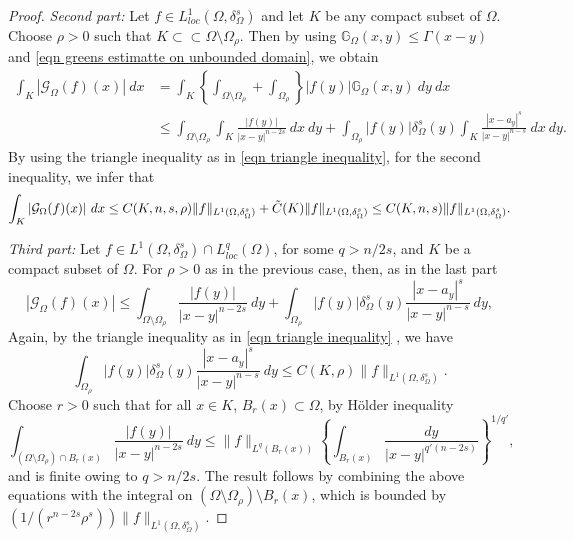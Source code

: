 \documentclass[10pt,a4paper]{amsart}
\newcommand{\g}[1]{\mathcal{G}_{#1}}
\newcommand{\gk}[1]{\mathbb{G}_{#1}}
\begin{document}
\begin{proof}
    \textit{Second part:}
    Let $f\in L^{1}_{loc}(\Omega,\delta_{\Omega}^{s})$ and let $K$ be any compact subset of $\Omega$. Choose $\rho>0$ such that $K\subset\subset \Omega\setminus\Omega_{\rho}$. Then by using $\gk{\Omega}(x,y)\leq \Gamma(x-y)$ and \eqref{eqn greens estimatte on unbounded domain}, we obtain
    \begin{equation*}
        \begin{split}
            \int_{K}|\g{\Omega}(f)(x)|\ dx&=\int_{K}\left\{\int_{\Omega\setminus\Omega_{\rho}}+\int_{\Omega_{\rho}}\right\}|f(y)|\gk{\Omega}(x,y)\ dy\ dx\\
            &\leq \int_{\Omega\setminus\Omega_{\rho}}\int_{K}\frac{|f(y)|}{|x-y|^{n-2s}}\ dx\ dy+\int_{\Omega_{\rho}}|f(y)|\delta_{\Omega}^{s}(y)\int_{K}\frac{|x-a_y|^{s}}{|x-y|^{n-s}}\ dx \ dy.
        \end{split}
    \end{equation*}
    By using the triangle inequality as in \eqref{eqn triangle inequality}, for the second inequality, we infer that
    \begin{equation*}
        \int_{K}|\g{\Omega}(f)(x)|\ dx\leq C(K,n,s,\rho)\|f\|_{L^{1}(\Omega,\delta_{\Omega}^{s})}+\Tilde{C}(K)\|f\|_{L^{1}(\Omega,\delta_{\Omega}^{s})}\leq C(K,n,s)\|f\|_{L^{1}(\Omega,\delta_{\Omega}^{s})}.
    \end{equation*}

    \textit{Third part:} Let $f\in L^{1}(\Omega,\delta_{\Omega}^{s})\cap L_{loc}^{q}(\Omega)$, for some $q>n/2s$, and $K$ be a compact subset of $\Omega$. For $\rho>0$ as in the previous case, then, as in the last part
    \begin{equation*}
        |\g{\Omega}(f)(x)| \leq \int_{\Omega\setminus\Omega_{\rho}}\frac{|f(y)|}{|x-y|^{n-2s}}\ dy+\int_{\Omega_{\rho}}|f(y)|\delta_{\Omega}^{s}(y)\frac{|x-a_y|^{s}}{|x-y|^{n-s}} \ dy,
    \end{equation*}
    Again, by the triangle inequality as in \eqref{eqn triangle inequality} %
    , we have
    \begin{equation*}
        \int_{\Omega_{\rho}}|f(y)|\delta_{\Omega}^{s}(y)\frac{|x-a_y|^{s}}{|x-y|^{n-s}} \ dy\leq C(K,\rho)\|f\|_{L^{1}(\Omega,\delta^{s}_{\Omega})}.
    \end{equation*}
    Choose $r>0$ such that for all $x\in K$, $B_{r}(x)\subset\Omega$, by H\"older inequality
    \begin{equation*}
        \int_{(\Omega\setminus\Omega_{\rho})\cap B_{r}(x)}\frac{|f(y)|}{|x-y|^{n-2s}}\ dy\leq \|f\|_{L^{q}(B_{r}(x))}\left\{\int_{B_{r}(x)}\frac{dy}{|x-y|^{q'(n-2s)}}\right\}^{1/q'},
    \end{equation*}
    and is finite owing to $q>n/2s$. The result follows by combining the above equations with the integral on $(\Omega\setminus\Omega_{\rho})\setminus B_{r}(x)$, which is bounded by $\left(1/(r^{n-2s}\rho^{s})\right)\|f\|_{L^{1}(\Omega,\delta_{\Omega}^{s})}$.
\end{proof}
\end{document}

